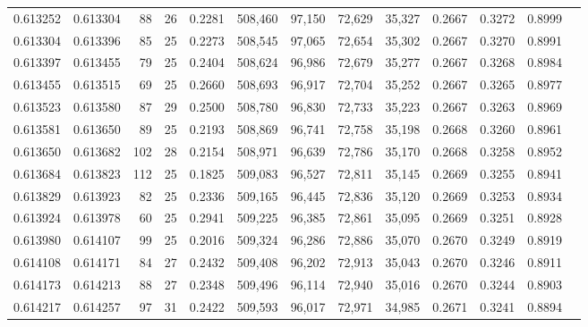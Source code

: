 \begin{tabular}{rrrrrrrrrrrrr}
0.613252 & 0.613304 &  88 &  26 &                                     0.2281 & 508,460 &  97,150 &  72,629 &  35,327 & 0.2667 & 0.3272 & 0.8999 \\
0.613304 & 0.613396 &  85 &  25 &                                     0.2273 & 508,545 &  97,065 &  72,654 &  35,302 & 0.2667 & 0.3270 & 0.8991 \\
0.613397 & 0.613455 &  79 &  25 &                                     0.2404 & 508,624 &  96,986 &  72,679 &  35,277 & 0.2667 & 0.3268 & 0.8984 \\
0.613455 & 0.613515 &  69 &  25 &                                     0.2660 & 508,693 &  96,917 &  72,704 &  35,252 & 0.2667 & 0.3265 & 0.8977 \\
0.613523 & 0.613580 &  87 &  29 &                                     0.2500 & 508,780 &  96,830 &  72,733 &  35,223 & 0.2667 & 0.3263 & 0.8969 \\
0.613581 & 0.613650 &  89 &  25 &                                     0.2193 & 508,869 &  96,741 &  72,758 &  35,198 & 0.2668 & 0.3260 & 0.8961 \\
0.613650 & 0.613682 & 102 &  28 &                                     0.2154 & 508,971 &  96,639 &  72,786 &  35,170 & 0.2668 & 0.3258 & 0.8952 \\
0.613684 & 0.613823 & 112 &  25 &                                     0.1825 & 509,083 &  96,527 &  72,811 &  35,145 & 0.2669 & 0.3255 & 0.8941 \\
0.613829 & 0.613923 &  82 &  25 &                                     0.2336 & 509,165 &  96,445 &  72,836 &  35,120 & 0.2669 & 0.3253 & 0.8934 \\
0.613924 & 0.613978 &  60 &  25 &                                     0.2941 & 509,225 &  96,385 &  72,861 &  35,095 & 0.2669 & 0.3251 & 0.8928 \\
0.613980 & 0.614107 &  99 &  25 &                                     0.2016 & 509,324 &  96,286 &  72,886 &  35,070 & 0.2670 & 0.3249 & 0.8919 \\
0.614108 & 0.614171 &  84 &  27 &                                     0.2432 & 509,408 &  96,202 &  72,913 &  35,043 & 0.2670 & 0.3246 & 0.8911 \\
0.614173 & 0.614213 &  88 &  27 &                                     0.2348 & 509,496 &  96,114 &  72,940 &  35,016 & 0.2670 & 0.3244 & 0.8903 \\
0.614217 & 0.614257 &  97 &  31 &                                     0.2422 & 509,593 &  96,017 &  72,971 &  34,985 & 0.2671 & 0.3241 & 0.8894 \\

\end{tabular}
